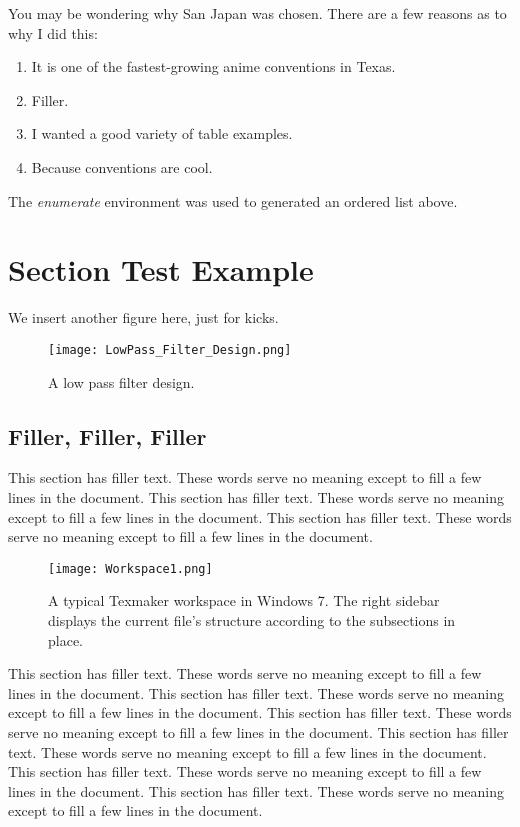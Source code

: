 You may be wondering why San Japan was chosen. There are a few reasons as to why I did this:

\begin{enumerate}
\item It is one of the fastest-growing anime conventions in Texas.
\item Filler.
\item I wanted a good variety of table examples.
\item Because conventions are cool.
\end{enumerate}

The \textit{enumerate} environment was used to generated an ordered list above.

\section{Section Test Example}
We insert another figure here, just for kicks.

\begin{figure}[h!]
	\centering
	\texttt{[image: LowPass\_Filter\_Design.png]}
	\caption{A low pass filter design.}
\end{figure}

\subsection{Filler, Filler, Filler}

This section has filler text. These words serve no meaning except to fill a few lines in the document. This section has filler text. These words serve no meaning except to fill a few lines in the document. This section has filler text. These words serve no meaning except to fill a few lines in the document.

\begin{figure}[h!]
	\centering
	\texttt{[image: Workspace1.png]}
	\caption{A typical Texmaker workspace in Windows 7. The right sidebar displays the current file's structure according to the subsections in place.}
\end{figure}

This section has filler text. These words serve no meaning except to fill a few lines in the document. This section has filler text. These words serve no meaning except to fill a few lines in the document. This section has filler text. These words serve no meaning except to fill a few lines in the document. This section has filler text. These words serve no meaning except to fill a few lines in the document. This section has filler text. These words serve no meaning except to fill a few lines in the document. This section has filler text. These words serve no meaning except to fill a few lines in the document.

